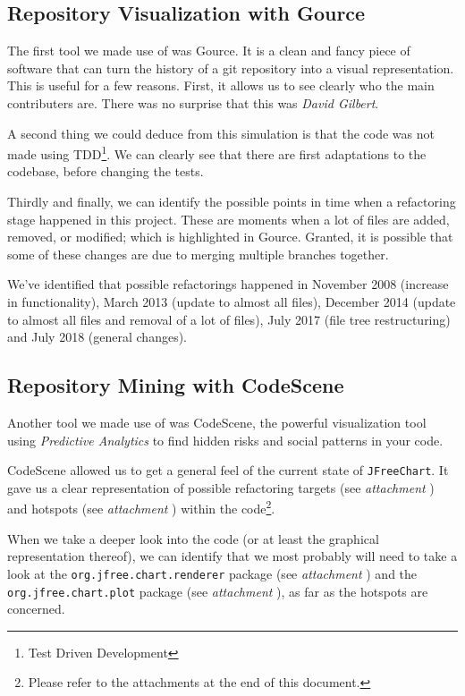 \documentclass[11pt]{article}
\begin{document}
	\subsection{Repository Visualization with Gource}
	The first tool we made use of was \textsf{Gource}. It is a clean and fancy piece of software that can turn the history of a git repository into a visual representation. This is useful for a few reasons. First, it allows us to see clearly who the main contributers are. There was no surprise that this was \textsl{David Gilbert}.
	
	A second thing we could deduce from this simulation is that the code was not made using TDD\footnote{Test Driven Development}. We can clearly see that there are first adaptations to the codebase, before changing the tests.
	
	Thirdly and finally, we can identify the possible points in time when a refactoring stage happened in this project. These are moments when a lot of files are added, removed, or modified; which is highlighted in \textsf{Gource}. Granted, it is possible that some of these changes are due to merging multiple branches together.
	
	We've identified that possible refactorings happened in November 2008 (increase in functionality), March 2013 (update to almost all files), December 2014 (update to almost all files and removal of a lot of files), July 2017 (file tree restructuring) and July 2018 (general changes).
	
	\subsection{Repository Mining with CodeScene}
	Another tool we made use of was \textsf{CodeScene}, the powerful visualization tool using \textit{Predictive Analytics} to find hidden risks and social patterns in your code.
	
	\textsf{CodeScene} allowed us to get a general feel of the current state of \texttt{JFreeChart}. It gave us a clear representation of possible refactoring targets (see \textsl{attachment \pageref{refactoring-overview}}) and hotspots (see \textsl{attachment \pageref{hotspots-overview}}) within the code\footnote{Please refer to the attachments at the end of this document.}.
	
	When we take a deeper look into the code (or at least the graphical representation thereof), we can identify that we most probably will need to take a look at the \texttt{org.jfree.chart.renderer} package (see \textsl{attachment \pageref{hotspots-package-renderer}}) and the \texttt{org.jfree.chart.plot} package (see \textsl{attachment \pageref{hotspots-package-plot}}), as far as the hotspots are concerned.
	
\end{document}
